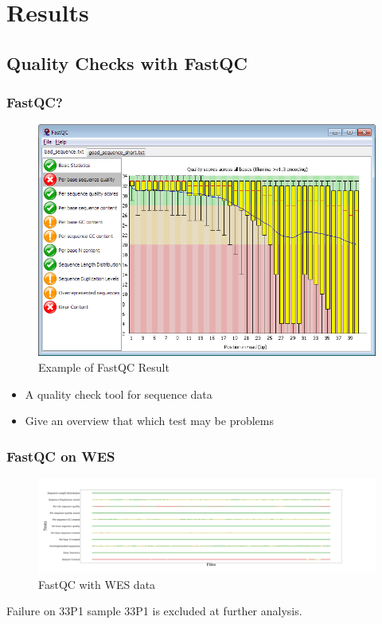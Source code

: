 \documentclass{beamer}
\begin{document}
    \section{Results}
    \subsection{Quality Checks with FastQC}
    \begin{frame}
        \frametitle{FastQC?}

        \begin{figure}
            \includegraphics[width=0.5 \linewidth]{figures/FastQC/example.png}
            \caption{Example of FastQC Result \protect\cite{fastqc1}}
        \end{figure}

        \begin{itemize}
            \item A quality check tool for sequence data
            \item Give an overview that which test may be problems
        \end{itemize}
    \end{frame}

    \begin{frame}
        \frametitle{FastQC on WES}

        \begin{figure}
            \includegraphics[width=\linewidth]{figures/FastQC/FastQC_WES.pdf}
            \caption{FastQC with WES data}
        \end{figure}

        \begin{alertblock}{Failure on 33P1 sample}
            33P1 is excluded at further analysis.
        \end{alertblock}
    \end{frame}
\end{document}

